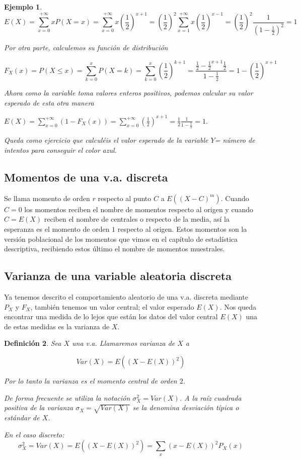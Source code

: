 \documentclass[12pt]{report}
\newtheorem{definition}{Definici\'on}
\newtheorem{example}[definition]{Ejemplo}
\begin{document}
\begin{example}
 $$E(X)=\sum_{x=0}^{+\infty} x P(X=x)=\sum_{x=0}^{+\infty} x
\left(\frac{1}{2}\right)^{x+1}= \left(\frac{1}{2}\right)^2\sum_{x=1}^{+\infty} x
\left(\frac{1}{2}\right)^{x-1}=\left(\frac{1}{2}\right)^2
\frac{1}{\left(1-\frac{1}{2}\right)^2}=1$$

Por otra parte, calculemos su función de distribución

$$F_X(x)=P(X\leq x)=\sum_{k=0}^x P(X=k)=\sum_{k=0}^x
(\frac{1}{2})^{k+1}=\frac{\frac{1}{2}-\frac{1}{2}^{x+1}
\frac{1}{2}}{1-\frac{1}{2}}=1-(\frac{1}{2})^{x+1}$$

Ahora como la variable toma valores enteros positivos, podemos calcular su valor esperado
de esta otra manera

$E(X)=\sum_{x=0}^{+\infty} (1-F_X(x))=\sum_{x=0}^{+\infty}(\frac{1}{2})^{x+1}=\frac{1}{2}
\frac{1}{1-\frac{1}{2}}=1.$

Queda como ejercicio que calculéis el valor esperado de la variable $Y$= número de intentos
para conseguir el color azul.

\end{example}

\subsection{Momentos de una v.a. discreta}

Se llama momento de orden $r$
    respecto al punto $C$ a $E((X-C)^m)$. Cuando $C=0$ los momentos reciben el
     nombre de momentos respecto al origen y cuando
    $C=E(X)$ reciben el nombre de centrales o respecto de la media, así la esperanza
     es el momento de orden $1$ respecto al origen. Estos momentos son la versión
     poblacional de los momentos que vimos en el capítulo de estadística descriptiva,
     recibiendo estos último el nombre de momentos muestrales.

\subsection{Varianza de una variable aleatoria discreta}

Ya tenemos descrito el comportamiento aleatorio de una v.a. discreta mediante $P_{X}$ y
$F_{X}$, también tenemos un valor central; el valor esperado $E(X)$. Nos queda encontrar
una medida de lo lejos que están los datos del valor central $E(X)$ una de estas medidas es
la varianza de $X$.



\begin{definition}
    Sea $X$ una v.a. Llamaremos varianza de $X$ a

    $$Var(X)=E((X-E(X))^2)$$

Por lo tanto la varianza es el momento
      central de orden $2$.

    De forma frecuente se utiliza la notación $\sigma_{X}^2=Var(X)$. A la raíz cuadrada
    positiva de la varianza
   $\sigma_{X}=\sqrt{Var(X)}$ se la denomina desviación típica  o estándar de $X$.

   En el caso discreto:
 $$\sigma_{X}^2=Var(X)=E((X-E(X))^2)=\sum_{x}(x-E(X))^2 P_{X}(x)$$
 \end{definition}
\end{document}
